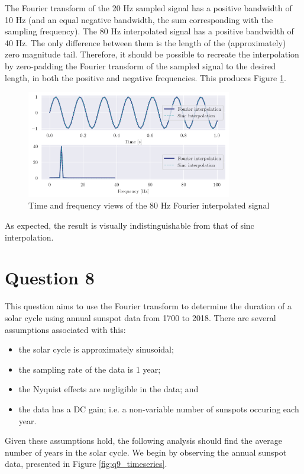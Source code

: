 \documentclass[a4paper, 11pt]{article}
\begin{document}
The Fourier transform of the 20 Hz sampled signal has a positive bandwidth of
10 Hz (and an equal negative bandwidth, the sum corresponding with the sampling
frequency). The 80 Hz interpolated signal has a positive bandwidth of 40 Hz.
The only difference between them is the length of the (approximately) zero
magnitude tail. Therefore, it should be possible to recreate the interpolation
by zero-padding the Fourier transform of the sampled signal to the desired
length, in both the positive and negative frequencies. This produces Figure
\ref{fig:q7_upsample}.

\begin{figure}[ht]
    \centering
    \includegraphics[width=0.8\textwidth]{images/q7_interpolated.png}
    \caption{Time and frequency views of the 80 Hz Fourier interpolated signal}
    \label{fig:q7_upsample}
\end{figure}

As expected, the result is visually indistinguishable from that of sinc
interpolation.

\newpage
\section*{Question 8}

This question aims to use the Fourier transform to determine the duration of a
solar cycle using annual sunspot data from 1700 to 2018. There are several
assumptions associated with this:
\begin{itemize}
    \item the solar cycle is approximately sinusoidal;
    \item the sampling rate of the data is 1 year;
    \item the Nyquist effects are negligible in the data; and
    \item the data has a DC gain; i.e. a non-variable number of sunspots
          occuring each year.
\end{itemize}
Given these assumptions hold, the following analysis should find the average
number of years in the solar cycle. We begin by observing the annual sunspot
data, presented in Figure \ref{fig:q9_timeseries}.
\end{document}
